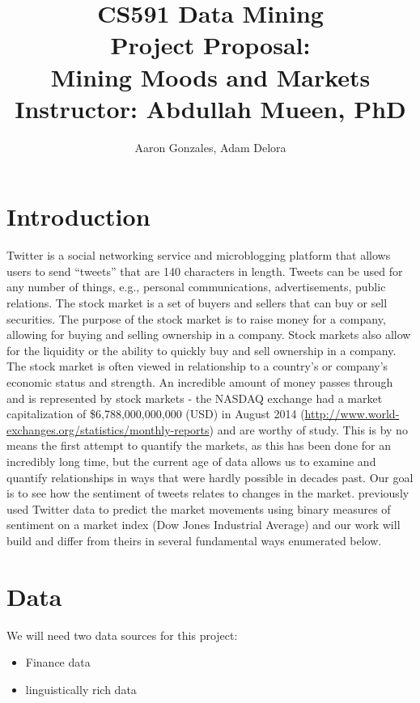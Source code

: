 \documentclass[titlepage]{article}\usepackage[]{graphicx}\usepackage[]{color}
\begin{document}
\title{CS591 Data Mining \\ Project Proposal: \\ Mining Moods and Markets \\
Instructor: Abdullah Mueen, PhD}
\author{Aaron Gonzales, Adam Delora}
\maketitle



\section{Introduction}

Twitter is a social networking service and microblogging platform that allows
users to send ``tweets'' that are 140 characters in length. Tweets can be used
for any number of things, e.g., personal communications, advertisements, public relations.
The stock market is a set of buyers and sellers that can buy or sell securities.
The purpose of the stock market is to raise money for a company, allowing for
buying and selling ownership in a company. Stock markets also allow for the
liquidity or the ability to quickly buy and sell ownership in a company. The
stock market is often viewed in relationship to a country's or company's
economic status and strength. An incredible amount of money passes through and
is represented by stock markets - the NASDAQ exchange had a market
capitalization of \$6,788,000,000,000 (USD) in August 2014 
(\url{http://www.world-exchanges.org/statistics/monthly-reports}) and are
worthy of study. This is by no means the first attempt to quantify the markets,
as this has been done for an incredibly long time, but the current age of data
allows us to examine and quantify relationships in ways that were hardly
possible in decades past. Our goal is to see how the sentiment of tweets
relates to changes in the market. \cite{twitterStockMarketPrediction}
previously used Twitter data to predict the market movements using binary
measures of sentiment on a market index (Dow Jones Industrial Average) and our work
will build and differ from theirs in several fundamental ways enumerated below. 

\section{Data}

We will need two data sources for this project: 
\begin{itemize}
	\item Finance data
	\item linguistically rich data
\end{itemize}
\end{document}
